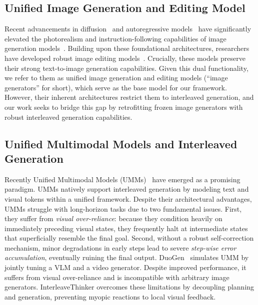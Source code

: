 \documentclass{article} %
\begin{document}
\subsection{Unified Image Generation and Editing Model}
Recent advancements in diffusion~\cite{ddpm,vae,controlnet} and autoregressive models~\cite{Qwen2.5-VL,yang2025qwen3} have significantly elevated the photorealism and instruction-following capabilities of image generation models~\cite{flux2024,sd3,podell2023sdxl,qwenimage,gen-searcher}. Building upon these foundational architectures, researchers have developed robust image editing models~\cite{step1x,qwenimage,longcatimage,glm_image,editthinker,zimage,flux2,nanopro}. Crucially, these models preserve their strong text-to-image generation capabilities. Given this dual functionality, we refer to them as unified image generation and editing models (``image generators'' for short), which serve as the base model for our framework. However, their inherent architectures restrict them to interleaved generation, and our work seeks to bridge this gap by retrofitting frozen image generators with robust interleaved generation capabilities.

\subsection{Unified Multimodal Models and Interleaved Generation}
Recently Unified Multimodal Models (UMMs)~\cite{bagel, januspro, longcatnext, wu2025omnigen2, wang2024emu3, cui2025emu3_5, cao2025hunyuanimage,uniedit,aia} have emerged as a promising paradigm. UMMs natively support interleaved generation by modeling text and visual tokens within a unified framework. Despite their architectural advantages, UMMs struggle with long-horizon tasks due to two fundamental issues. First, they suffer from \textit{visual over-reliance}: because they condition heavily on immediately preceding visual states, they frequently halt at intermediate states that superficially resemble the final goal. Second, without a robust self-correction mechanism, minor degradations in early steps lead to severe \textit{step-wise error accumulation}, eventually ruining the final output. DuoGen~\cite{duogen} simulates UMM by jointly tuning a VLM and a video generator. Despite improved performance, it suffers from visual over-reliance and is incompatible with arbitrary image generators. InterleaveThinker overcomes these limitations by decoupling planning and generation, preventing myopic reactions to local visual feedback.
\end{document}
